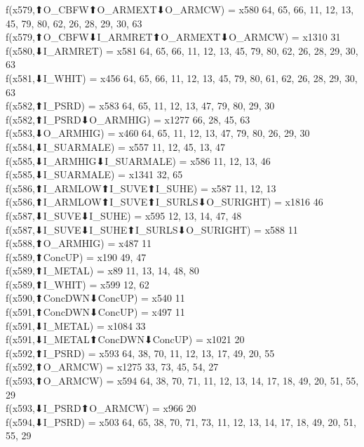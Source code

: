 f(x579,⬆O_CBFW⬆O_ARMEXT⬇O_ARMCW) = x580 {64, 65, 66, 11, 12, 13, 45, 79, 80, 62, 26, 28, 29, 30, 63} \\
f(x579,⬆O_CBFW⬇I_ARMRET⬆O_ARMEXT⬇O_ARMCW) = x1310 {31} \\
f(x580,⬇I_ARMRET) = x581 {64, 65, 66, 11, 12, 13, 45, 79, 80, 62, 26, 28, 29, 30, 63} \\
f(x581,⬇I_WHIT) = x456 {64, 65, 66, 11, 12, 13, 45, 79, 80, 61, 62, 26, 28, 29, 30, 63} \\
f(x582,⬆I_PSRD) = x583 {64, 65, 11, 12, 13, 47, 79, 80, 29, 30} \\
f(x582,⬆I_PSRD⬇O_ARMHIG) = x1277 {66, 28, 45, 63} \\
f(x583,⬇O_ARMHIG) = x460 {64, 65, 11, 12, 13, 47, 79, 80, 26, 29, 30} \\
f(x584,⬇I_SUARMALE) = x557 {11, 12, 45, 13, 47} \\
f(x585,⬇I_ARMHIG⬇I_SUARMALE) = x586 {11, 12, 13, 46} \\
f(x585,⬇I_SUARMALE) = x1341 {32, 65} \\
f(x586,⬆I_ARMLOW⬆I_SUVE⬆I_SUHE) = x587 {11, 12, 13} \\
f(x586,⬆I_ARMLOW⬆I_SUVE⬆I_SURLS⬇O_SURIGHT) = x1816 {46} \\
f(x587,⬇I_SUVE⬇I_SUHE) = x595 {12, 13, 14, 47, 48} \\
f(x587,⬇I_SUVE⬇I_SUHE⬆I_SURLS⬇O_SURIGHT) = x588 {11} \\
f(x588,⬆O_ARMHIG) = x487 {11} \\
f(x589,⬆ConcUP) = x190 {49, 47} \\
f(x589,⬆I_METAL) = x89 {11, 13, 14, 48, 80} \\
f(x589,⬆I_WHIT) = x599 {12, 62} \\
f(x590,⬆ConcDWN⬇ConcUP) = x540 {11} \\
f(x591,⬆ConcDWN⬇ConcUP) = x497 {11} \\
f(x591,⬇I_METAL) = x1084 {33} \\
f(x591,⬇I_METAL⬆ConcDWN⬇ConcUP) = x1021 {20} \\
f(x592,⬆I_PSRD) = x593 {64, 38, 70, 11, 12, 13, 17, 49, 20, 55} \\
f(x592,⬆O_ARMCW) = x1275 {33, 73, 45, 54, 27} \\
f(x593,⬆O_ARMCW) = x594 {64, 38, 70, 71, 11, 12, 13, 14, 17, 18, 49, 20, 51, 55, 29} \\
f(x593,⬇I_PSRD⬆O_ARMCW) = x966 {20} \\
f(x594,⬇I_PSRD) = x503 {64, 65, 38, 70, 71, 73, 11, 12, 13, 14, 17, 18, 49, 20, 51, 55, 29} \\
